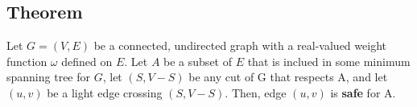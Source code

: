 \subsection {Theorem}

Let $G=(V, E)$ be a connected, undirected graph with a real-valued weight
function $\omega$ defined on $E$. Let $A$ be a subset of $E$ that is inclued in
some minimum spanning tree for $G$, let $(S, V - S)$ be any cut of G that
respects A, and let $(u, v)$ be a light edge crossing $(S, V - S)$. Then, edge
$(u, v)$ is \textbf{safe} for A.

